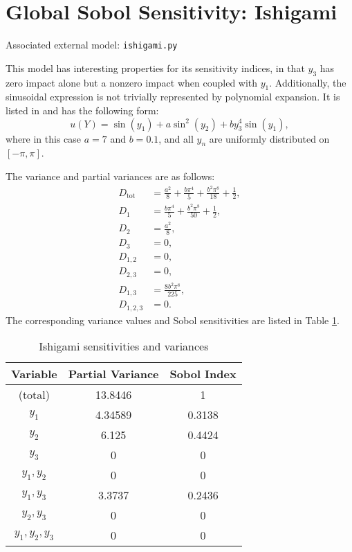 \section{Global Sobol Sensitivity: Ishigami}
Associated external model: \texttt{ishigami.py}

This model has interesting properties for its sensitivity indices, in that $y_3$ has zero impact alone but a
nonzero impact when coupled with $y_1$.  Additionally, the sinusoidal expression is not trivially represented
by polynomial expansion.  It is listed in \cite{saltelli2000} and has the following form:
\begin{equation}
  u(Y) = \sin(y_1) + a\sin^2(y_2) + b y_3^4\sin(y_1),
\end{equation}
where in this case $a=7$ and $b=0.1$, and all $y_n$ are uniformly distributed on $[-\pi,\pi]$.

The variance and partial variances are as follows:
\begin{align}
  D_\text{tot} &= \frac{a^2}{8} + \frac{b\pi^4}{5} + \frac{b^2\pi^8}{18} + \frac{1}{2}, \\
  D_1 &= \frac{b\pi^4}{5} + \frac{b^2\pi^8}{50} + \frac{1}{2} ,\\
  D_2 &= \frac{a^2}{8}, \\
  D_3 &= 0, \\
  D_{1,2} &= 0, \\
  D_{2,3} &= 0, \\
  D_{1,3} &= \frac{8b^2\pi^8}{225}, \\
  D_{1,2,3} &= 0.
\end{align}
The corresponding variance values and Sobol sensitivities are listed in Table \ref{tab:ishigami sens}.
\begin{table}[h]
  \centering
  \begin{tabular}{c|c|c}
    Variable & Partial Variance & Sobol Index \\ \hline
    (total) & 13.8446 & 1 \\
    $y_1$         & 4.34589 & 0.3138 \\
    $y_2$         & 6.125   & 0.4424 \\
    $y_3$         & 0       & 0      \\
    $y_1,y_2$     & 0       & 0      \\
    $y_1,y_3$     & 3.3737  & 0.2436 \\
    $y_2,y_3$     & 0       & 0      \\
    $y_1,y_2,y_3$ & 0       & 0      \\
  \end{tabular}
  \caption{Ishigami sensitivities and variances}
  \label{tab:ishigami sens}
\end{table}

